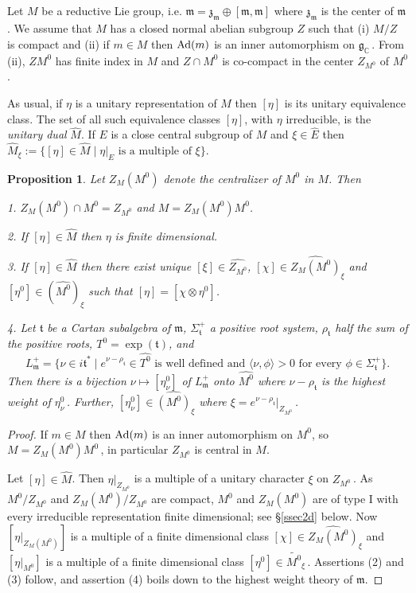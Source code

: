 \documentclass{conm-p-l}
\newtheorem{proposition}[equation]{Proposition}
\renewcommand{\gg}{\mathfrak{g}}
\def\gg{\mathfrak{g}}
\def\gm{\mathfrak{m}}
\def\gt{\mathfrak{t}}
\def\gz{\mathfrak{z}}
\def\Ad{{\rm Ad}}
\def\C{\mathbb{C}}
\begin{document}
\subsection{}\label{ssec1a}  
\setcounter{equation}{0}
Let $M$ be a reductive Lie group, i.e.
$\gm = \gz_\gm \oplus [\gm,\gm]$ where $\gz_\gm$ is the center of $\gm$.
We assume that $M$ has a closed normal abelian subgroup $Z$ such that 
(i) $M/Z$ is compact and (ii) if $m \in M$ then $\Ad(m)$ is an inner 
automorphism on $\gg_\C$\,.  From (ii), $ZM^0$ has finite index in $M$
and $Z\cap M^0$ is co-compact in the center $Z_{M^0}$ of $M^0$.

As usual, if $\eta$ is a unitary representation of $M$ then $[\eta]$ is
its unitary equivalence class.  The set of all such equivalence classes
$[\eta]$, with $\eta$ irreducible,
is the {\em unitary dual} $\widehat{M}$.  If $E$ is a close central subgroup
of $M$ and $\xi \in \widehat{E}$ then $\widehat{M}_\xi
:= \{[\eta] \in \widehat{M} \mid \eta|_E \text{ is a multiple of } \xi\}$.

\begin{proposition} \label{1.1.3}
Let $Z_M(M^0)$ denote the centralizer of $M^0$ in $M$.  Then

\noindent
{\rm 1.} $Z_M(M^0)\cap M^0 = Z_{M^0}$ and $M = Z_M(M^0)M^0$.

\noindent
{\rm 2.} If $[\eta] \in \widehat{M}$ then $\eta$ is finite dimensional.

\noindent
{\rm 3.} If $[\eta] \in \widehat{M}$ then there exist unique 
$[\xi] \in \widehat{Z_{M^0}}$, $[\chi] \in \widehat{Z_M(M^0)}_\xi$ and
$[\eta^0] \in (\widehat{M^0})_\xi$ such that $[\eta] = [\chi \otimes \eta^0]$.

\noindent
{\rm 4.} Let $\gt$ be a Cartan subalgebra of $\gm$, $\Sigma^+_\gt$ a positive
root system, $\rho_\gt$ half the sum of the positive roots, $T^0 = \exp(\gt)$,
and 
$$
L_\gm^+ = \{\nu \in i\gt^* \mid e^{\nu - \rho_\gt} \in \widehat{T^0}
\text{ is well defined and } \langle \nu, \phi \rangle > 0 
 \text{ for every } \phi \in \Sigma_\gt^+\}.
$$
Then there is a bijection $\nu \mapsto [\eta_\nu^0]$
of $L_\gm^+$ onto $\widehat{M^0}$ where $\nu - \rho_\gt$ is the highest
weight of $\eta_\nu^0$\,.  Further, $[\eta_\nu^0] \in \widehat{(M^0)}_\xi$
where $\xi = e^{\nu - \rho_\gt}|_{Z_{M^0}}$\,.
\end{proposition}

\begin{proof} If $m \in M$ then $\Ad(m)$ is an inner automorphism on $M^0$,
so  $M = Z_M(M^0)M^0$\,, in particular $Z_{M^0}$ is central in $M$.

Let $[\eta] \in \widehat{M}$.  Then $\eta|_{Z_{M^0}}$ is a multiple of a
unitary character $\xi$ on $Z_{M^0}$\,.  As $M^0/Z_{M^0}$ and 
$Z_M(M^0)/Z_{M^0}$ are compact, $M^0$ and $Z_M(M^0)$ are of type I with
every irreducible representation finite dimensional; see \S \ref{ssec2d}
below.  Now $[\eta|_{Z_M(M^0)}]$ is a multiple of a finite dimensional class
$[\chi] \in \widehat{Z_M(M^0)}_\xi$ and $[\eta|_{M^0}]$ is a multiple
of a finite dimensional class $[\eta^0] \in \widetilde{M^0}_\xi$\,.
Assertions (2) and (3) follow, and assertion (4) boils down to the highest
weight theory of $\gm$.
\end{proof}
\end{document}
